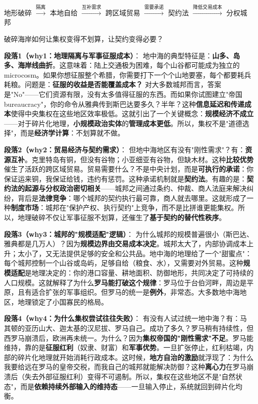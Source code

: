 \documentclass[../main.tex]{subfiles}
\begin{document}
	\begin{logicmap}
		地形破碎 $\xrightarrow{\text{隔离}}$ 本地自给 $\xrightarrow{\text{互补需求}}$ 跨区域贸易 $\xrightarrow{\text{需要承诺}}$ 契约法 $\xrightarrow{\text{降低交易成本}}$ 分权城邦
	\end{logicmap}
	
	\begin{questionbox}
		破碎海岸如何让集权变得不划算，让契约变得必要？
	\end{questionbox}
	
	\textbf{段落1（why1：地理隔离与军事征服成本）}：  
	地中海的典型特征是：\textbf{山多、岛多、海岸线曲折}。这意味着：陆上交通极为困难，每个山谷都可能成为独立的 microcosm。如果你想征服整个希腊，你需要打下一个个山地要塞，每个都要耗兵耗粮。问题是：\textbf{征服的收益是否能覆盖成本？} 对大多数城邦而言，答案是"No"——它们资源有限，没有太多值得征服的东西。而如果你试图建立"帝国 bureaucracy"，你的命令从雅典传到斯巴达要多久？半年？这种\textbf{信息延迟和传递成本}使得中央集权在这些地区效率极低。这就引出了一个关键概念：\textbf{规模经济不成立}——对于碎片化地理，\textbf{小规模政治实体}的\textbf{管理成本更低}。所以，集权不是"道德选择"，而是\textbf{经济学计算}：不划算就不做。
	
	\textbf{段落2（why2：贸易经济与契约需求）}：  
	但地中海地区有没有"刚性需求"？有：\textbf{资源互补}。克里特岛有铜，但没有谷物；小亚细亚有谷物，但缺木材。这种\textbf{比较优势}催生了活跃的跨区域贸易。贸易需要什么？不是中央计划，而是\textbf{可执行的承诺}：你保证运来铜，我保证给钱，违约有惩罚。这种承诺机制就是\textbf{契约法}。有趣的是：\textbf{契约法的起源与分权政治密切相关}——城邦之间通过条约、仲裁、商人法庭来解决纠纷，背后是\textbf{法律竞争}：哪个城邦的契约执行最可靠，商人就去哪里。这就形成了一种\textbf{制度市场}：城邦在"保护产权、执行契约"上竞争，而不是比拼谁更能集权。所以，地理破碎不仅让军事征服不划算，还催生了\textbf{基于契约的替代性秩序}。
	
	\textbf{段落3（why3：城邦的"规模适配"逻辑）}：  
	为什么城邦的规模普遍很小（斯巴达、雅典都是几万人）？因为\textbf{规模边界由交易成本决定}。城邦太大了，内部协调成本上升；太小了，又无法提供足够的安全和公共品。地中海的地理给了一个"甜蜜点"：每个城邦控制一个山谷或岛屿，足够自给（粮食、水），又需要对外贸易。这种\textbf{规模适配}是地理决定的：你的港口容量、耕地面积、防御地形，共同决定了可持续的人口规模。这就解释了为什么\textbf{罗马能打破这个规律}：罗马位于台伯河畔，周边是平原，且有适合扩张的军事组织。但罗马的统一是\textbf{例外}，非常态。大多数地中海地区，地理锁定了小国寡民的格局。
	
	\textbf{段落4（why4：为什么集权尝试往往失败）}：  
	有没有人试过统一地中海？有：马其顿的亚历山大、迦太基的汉尼拔、罗马自己。成功了多久？罗马稍有持续性，但西罗马崩溃后，欧洲再未统一。为什么？因为\textbf{集权帝国的"刚性需求"不足}。罗马能维持，靠的是\textbf{征服红利}（奴隶、财富）和\textbf{军事优势}。一旦扩张停止，红利枯竭，内部的碎片化地理就开始消耗行政成本。这时候，\textbf{地方自治的激励}就浮现了：为什么我要给远在罗马的皇帝交税，而我自己的城邦就能解决防御？这种\textbf{离心力}在罗马崩溃后（失去外部征服红利）变得不可遏制。所以，集权在这些地区不是"自然状态"，而是\textbf{依赖持续外部输入的维持态}——一旦输入停止，系统就回到碎片化均衡。
	
\end{document}
